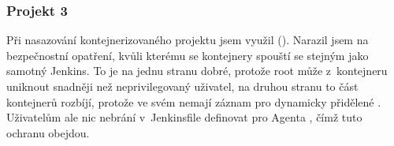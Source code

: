         \subsubsection{Projekt 3}
            Při nasazování kontejnerizovaného projektu jsem využil  (). Narazil jsem na bezpečnostní opatření, kvůli kterému se kontejnery spouští se stejným  jako samotný Jenkins. To je na jednu stranu dobré, protože root může z~kontejneru uniknout snadněji než neprivilegovaný uživatel, na druhou stranu to část kontejnerů rozbíjí, protože ve svém  nemají záznam pro dynamicky přidělené . Uživatelům ale nic nebrání v~Jenkinsfile definovat pro Agenta , čímž tuto ochranu obejdou.

